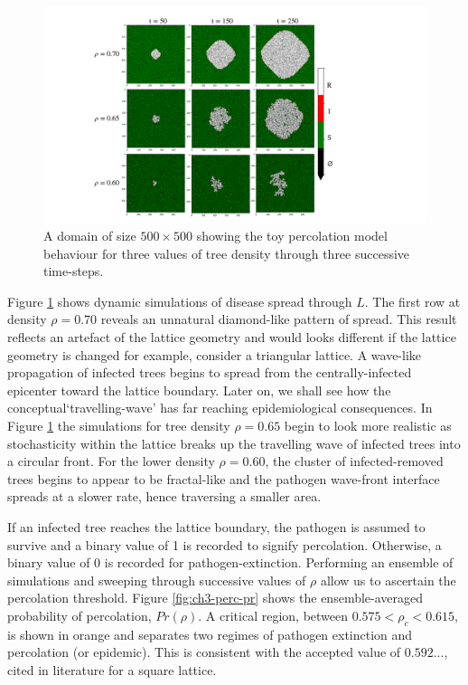\begin{figure}
    \centering
    \includegraphics[scale=0.40]{chapter3/figures/figure1.pdf}
    \caption{A domain of size $\mathrm{500\times 500}$ showing the toy percolation model behaviour for three values of tree density through three successive time-steps.}
    \label{fig:ch3-perc-spread}
\end{figure}

Figure \ref{fig:ch3-perc-spread} shows dynamic simulations of disease spread through $L$. %
The first row at density $\rho=0.70$ reveals an unnatural diamond-like pattern of spread. %
This result reflects an artefact of the lattice geometry and would looks different if the lattice geometry is changed \textemdash for example, consider a triangular lattice. %
A wave-like propagation of infected trees begins to spread from the centrally-infected epicenter toward the lattice boundary. %
Later on, we shall see how the conceptual`travelling-wave' has far reaching epidemiological consequences. %
In Figure \ref{fig:ch3-perc-spread} the simulations for tree density $\rho=0.65$ begin to %
look more realistic as stochasticity within the lattice breaks up the travelling wave of infected trees into a circular front. %
For the lower density $\rho = 0.60$, the cluster of infected-removed trees begins to appear %
to be fractal-like and the pathogen wave-front interface spreads at a slower rate, %
hence traversing a smaller area. %

If an infected tree reaches the lattice boundary, the pathogen is assumed to survive and a binary value of 1 is recorded to signify percolation. %
Otherwise, a binary value of 0 is recorded for pathogen-extinction. %
Performing an ensemble of simulations and sweeping through successive values of $\rho$ allow us to ascertain the percolation threshold. %
Figure \ref{fig:ch3-perc-pr} shows the ensemble-averaged probability of percolation, $Pr(\rho)$. A critical region, between $ 0.575 < \rho_c < 0.615$, is shown in orange and separates two regimes of pathogen extinction and percolation (or epidemic). %
This is consistent with the accepted value of $0.592...$, cited in literature for a square lattice. %
 
